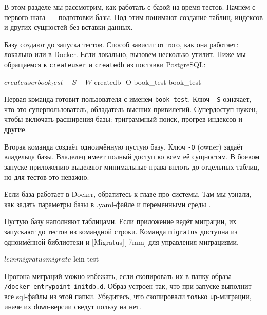 В этом разделе мы рассмотрим, как работать с базой на время тестов. Начнём с
первого шага~--- подготовки базы. Под этим понимают создание таблиц, индексов и
других сущностей без вставки данных.


Базу создают до запуска тестов. Способ зависит от того, как она работает:
локально или в Docker. Если локально, вызовем несколько утилит. Ниже мы
обращаемся к \verb|createuser| и \verb|createdb| из поставки PostgreSQL:

\begin{english}
  \begin{bash}
$ createuser book_test -S -W
$ createdb -O book_test book_test
  \end{bash}
\end{english}

Первая команда готовит пользователя с именем \verb|book_test|. Ключ~\verb|-S|
означает, что это суперпользователь, обладатель высших привилегий. Супердоступ
нужен, чтобы включать расширения базы: триграммный поиск, прогрев индексов и
другие.

Вторая команда создаёт одноимённую пустую базу. Ключ \verb|-O| (owner) задаёт
владельца базы. Владелец имеет полный доступ ко всем её сущностям. В боевом
запуске приложению выделяют минимальные права вплоть до отдельных таблиц, но для
тестов это неважно.


Если база работает в Docker, обратитесь к главе про системы. Там мы узнали, как
задать параметры базы в .yaml-файле и переменными среды .


Пустую базу наполняют таблицами. Если приложение ведёт миграции, их запускают до
тестов из командной строки. Команда \verb|migratus| доступна из одноимённой
библиотеки и [Migratus][-7mm]
для управления миграциями.

\begin{english}
  \begin{clojure}
$ lein migratus migrate
$ lein test
  \end{clojure}
\end{english}

Прогона миграций можно избежать, если скопировать их в папку образа
\texttt{/docker-entry\-point-initdb.d}. Образ устроен так, что при запуске
выполнит все sql-файлы из этой папки. Убедитесь, что скопировали только
\verb|up|-миграции, иначе их \verb|down|-версии сведут пользу на нет.

